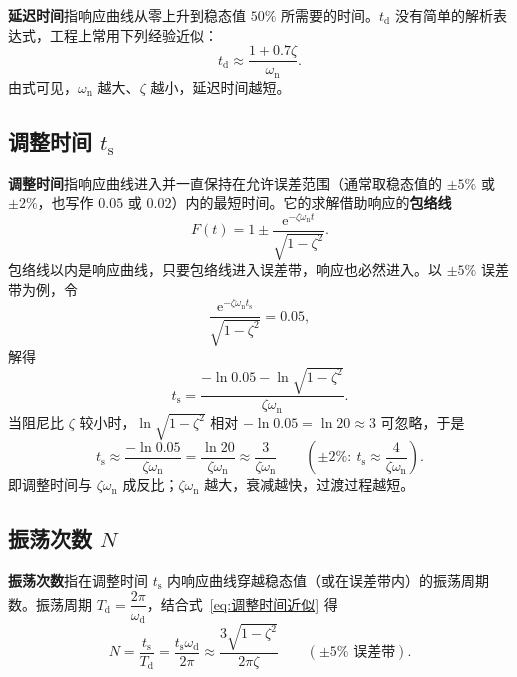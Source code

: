 \textbf{延迟时间}指响应曲线从零上升到稳态值 $50\%$ 所需要的时间。$t_{\mathrm{d}}$ 没有简单的解析表达式，工程上常用下列经验近似：
\begin{equation}
t_{\mathrm{d}}\approx\frac{1+0.7\zeta}{\omega_{\mathrm{n}}}.
\label{eq:延迟时间}
\end{equation}
由式可见，$\omega_{\mathrm{n}}$ 越大、$\zeta$ 越小，延迟时间越短。

\subsection{调整时间 $t_{\mathrm{s}}$}
\label{sec:调整时间}

\textbf{调整时间}指响应曲线进入并一直保持在允许误差范围（通常取稳态值的 $\pm5\%$ 或 $\pm2\%$，也写作 $0.05$ 或 $0.02$）内的最短时间。它的求解借助响应的\textbf{包络线}
\begin{equation}
F(t)=1\pm\frac{\mathrm{e}^{-\zeta\omega_{\mathrm{n}}t}}{\sqrt{1-\zeta^{2}}}.
\label{eq:响应包络线}
\end{equation}
包络线以内是响应曲线，只要包络线进入误差带，响应也必然进入。以 $\pm5\%$ 误差带为例，令
\[
\frac{\mathrm{e}^{-\zeta\omega_{\mathrm{n}}t_{\mathrm{s}}}}{\sqrt{1-\zeta^{2}}}=0.05,
\]
解得
\begin{equation}
t_{\mathrm{s}}=\frac{-\ln 0.05-\ln\sqrt{1-\zeta^{2}}}{\zeta\omega_{\mathrm{n}}}.
\label{eq:调整时间精确}
\end{equation}
当阻尼比 $\zeta$ 较小时，$\ln\sqrt{1-\zeta^{2}}$ 相对 $-\ln 0.05=\ln20\approx3$ 可忽略，于是
\begin{equation}
t_{\mathrm{s}}\approx\frac{-\ln 0.05}{\zeta\omega_{\mathrm{n}}}=\frac{\ln20}{\zeta\omega_{\mathrm{n}}}\approx\frac{3}{\zeta\omega_{\mathrm{n}}}
\qquad(\pm2\%:\ t_{\mathrm{s}}\approx\frac{4}{\zeta\omega_{\mathrm{n}}}).
\label{eq:调整时间近似}
\end{equation}
即调整时间与 $\zeta\omega_{\mathrm{n}}$ 成反比；$\zeta\omega_{\mathrm{n}}$ 越大，衰减越快，过渡过程越短。

\subsection{振荡次数 $N$}
\label{sec:振荡次数}

\textbf{振荡次数}指在调整时间 $t_{\mathrm{s}}$ 内响应曲线穿越稳态值（或在误差带内）的振荡周期数。振荡周期 $T_{\mathrm{d}}=\dfrac{2\pi}{\omega_{\mathrm{d}}}$，结合式~\eqref{eq:调整时间近似} 得
\begin{equation}
N=\frac{t_{\mathrm{s}}}{T_{\mathrm{d}}}=\frac{t_{\mathrm{s}}\omega_{\mathrm{d}}}{2\pi}
\approx\frac{3\sqrt{1-\zeta^{2}}}{2\pi\zeta}
\qquad(\pm5\%\text{ 误差带}).
\label{eq:振荡次数}
\end{equation}

